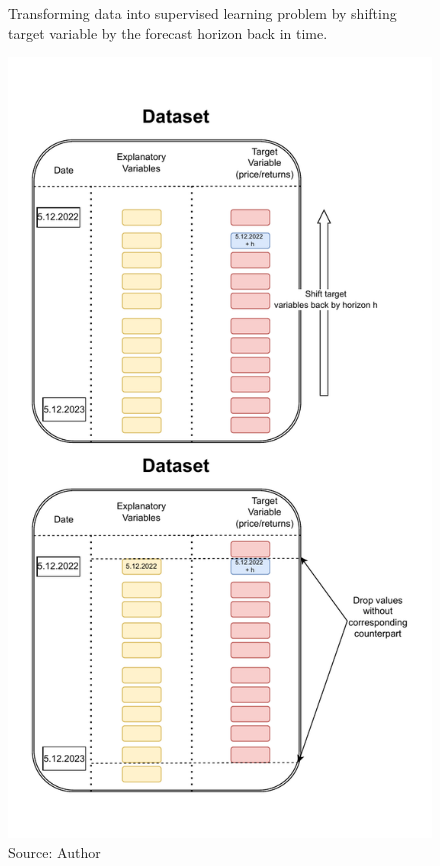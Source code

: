 \begin{figure}[!h]
    \centering
    \caption{Transforming data into supervised learning problem
    by shifting target variable by the forecast horizon back in time.}
        \includegraphics[width=1\textwidth, height=0.9\textheight,keepaspectratio]{Figures/data_shift.drawio.pdf}
    \caption*{Source: Author}
    \label{fig:dataset_shift}
\end{figure}

